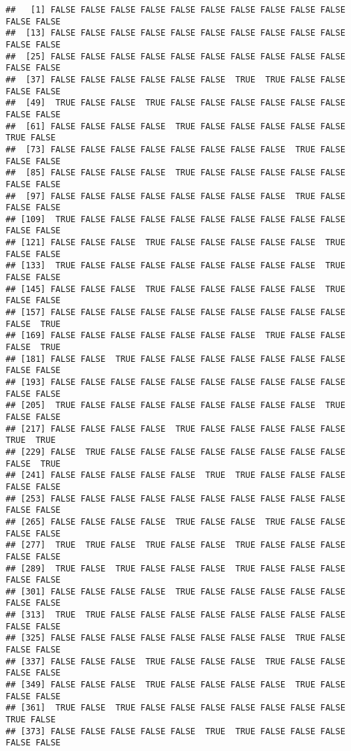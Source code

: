 \documentclass[
]{book}
\begin{document}
\begin{verbatim}
##   [1] FALSE FALSE FALSE FALSE FALSE FALSE FALSE FALSE FALSE FALSE FALSE FALSE
##  [13] FALSE FALSE FALSE FALSE FALSE FALSE FALSE FALSE FALSE FALSE FALSE FALSE
##  [25] FALSE FALSE FALSE FALSE FALSE FALSE FALSE FALSE FALSE FALSE FALSE FALSE
##  [37] FALSE FALSE FALSE FALSE FALSE FALSE  TRUE  TRUE FALSE FALSE FALSE FALSE
##  [49]  TRUE FALSE FALSE  TRUE FALSE FALSE FALSE FALSE FALSE FALSE FALSE FALSE
##  [61] FALSE FALSE FALSE FALSE  TRUE FALSE FALSE FALSE FALSE FALSE  TRUE FALSE
##  [73] FALSE FALSE FALSE FALSE FALSE FALSE FALSE FALSE  TRUE FALSE FALSE FALSE
##  [85] FALSE FALSE FALSE FALSE  TRUE FALSE FALSE FALSE FALSE FALSE FALSE FALSE
##  [97] FALSE FALSE FALSE FALSE FALSE FALSE FALSE FALSE  TRUE FALSE FALSE FALSE
## [109]  TRUE FALSE FALSE FALSE FALSE FALSE FALSE FALSE FALSE FALSE FALSE FALSE
## [121] FALSE FALSE FALSE  TRUE FALSE FALSE FALSE FALSE FALSE  TRUE FALSE FALSE
## [133]  TRUE FALSE FALSE FALSE FALSE FALSE FALSE FALSE FALSE  TRUE FALSE FALSE
## [145] FALSE FALSE FALSE  TRUE FALSE FALSE FALSE FALSE FALSE  TRUE FALSE FALSE
## [157] FALSE FALSE FALSE FALSE FALSE FALSE FALSE FALSE FALSE FALSE FALSE  TRUE
## [169] FALSE FALSE FALSE FALSE FALSE FALSE FALSE  TRUE FALSE FALSE FALSE  TRUE
## [181] FALSE FALSE  TRUE FALSE FALSE FALSE FALSE FALSE FALSE FALSE FALSE FALSE
## [193] FALSE FALSE FALSE FALSE FALSE FALSE FALSE FALSE FALSE FALSE FALSE FALSE
## [205]  TRUE FALSE FALSE FALSE FALSE FALSE FALSE FALSE FALSE  TRUE FALSE FALSE
## [217] FALSE FALSE FALSE FALSE  TRUE FALSE FALSE FALSE FALSE FALSE  TRUE  TRUE
## [229] FALSE  TRUE FALSE FALSE FALSE FALSE FALSE FALSE FALSE FALSE FALSE  TRUE
## [241] FALSE FALSE FALSE FALSE FALSE  TRUE  TRUE FALSE FALSE FALSE FALSE FALSE
## [253] FALSE FALSE FALSE FALSE FALSE FALSE FALSE FALSE FALSE FALSE FALSE FALSE
## [265] FALSE FALSE FALSE FALSE  TRUE FALSE FALSE  TRUE FALSE FALSE FALSE FALSE
## [277]  TRUE  TRUE FALSE  TRUE FALSE FALSE  TRUE FALSE FALSE FALSE FALSE FALSE
## [289]  TRUE FALSE  TRUE FALSE FALSE FALSE  TRUE FALSE FALSE FALSE FALSE FALSE
## [301] FALSE FALSE FALSE FALSE  TRUE FALSE FALSE FALSE FALSE FALSE FALSE FALSE
## [313]  TRUE  TRUE FALSE FALSE FALSE FALSE FALSE FALSE FALSE FALSE FALSE FALSE
## [325] FALSE FALSE FALSE FALSE FALSE FALSE FALSE FALSE  TRUE FALSE FALSE FALSE
## [337] FALSE FALSE FALSE  TRUE FALSE FALSE FALSE  TRUE FALSE FALSE FALSE FALSE
## [349] FALSE FALSE FALSE  TRUE FALSE FALSE FALSE FALSE  TRUE FALSE FALSE FALSE
## [361]  TRUE FALSE  TRUE FALSE FALSE FALSE FALSE FALSE FALSE FALSE  TRUE FALSE
## [373] FALSE FALSE FALSE FALSE FALSE  TRUE  TRUE FALSE FALSE FALSE FALSE FALSE

\end{verbatim}
\end{document}
